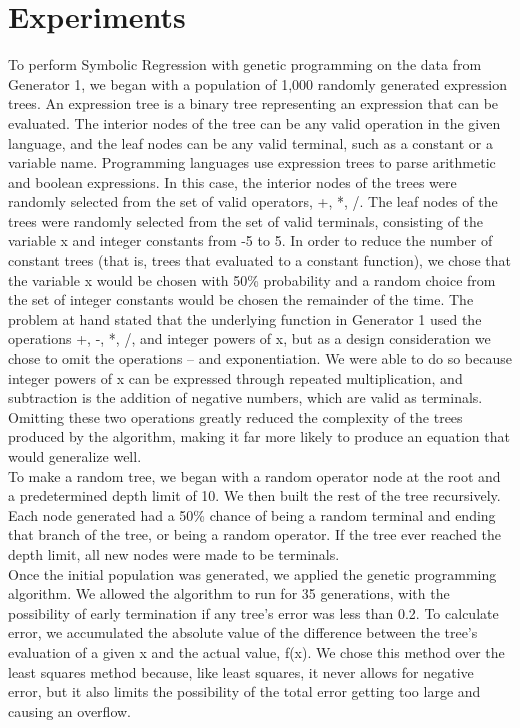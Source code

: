 
\section{Experiments}
\label{sec:expts}

	To perform Symbolic Regression with genetic programming on the
        data from Generator 1, we began with a population of 1,000
        randomly generated expression trees. An expression tree is a binary tree representing an expression that can be evaluated. The interior nodes of the tree can be any valid operation in the given language, and the leaf nodes can be any valid terminal, such as a constant or a variable name. Programming languages use expression trees to parse arithmetic and boolean expressions. In this case, the interior nodes of the
        trees were randomly selected from the set of valid operators,
        {+, *, /}. The leaf nodes of the trees were randomly selected
        from the set of valid terminals, consisting of the variable x
        and integer constants from -5 to 5. In order to reduce the
        number of constant trees (that is, trees that evaluated to a
        constant function), we chose that the variable x would be
        chosen with 50\% probability and a random choice from the set
        of integer constants would be chosen the remainder of the
        time. The problem at hand stated that the underlying function
        in Generator 1 used the operations +, -, *, /, and integer
        powers of x, but as a design consideration we chose to omit
        the operations – and exponentiation. We were able to do so
        because integer powers of x can be expressed through repeated
        multiplication, and subtraction is the addition of negative
        numbers, which are valid as terminals. Omitting these two
        operations greatly reduced the complexity of the trees
        produced by the algorithm, making it far more likely to
        produce an equation that would generalize well.\\

	To make a random tree, we began with a random operator node at
        the root and a predetermined depth limit of 10. We then built
        the rest of the tree recursively. Each node generated had a
        50\% chance of being a random terminal and ending that branch
        of the tree, or being a random operator. If the tree ever
        reached the depth limit, all new nodes were made to be
        terminals.\\

	Once the initial population was generated, we applied the
        genetic programming algorithm. We allowed the algorithm to run
        for 35 generations, with the possibility of early termination
        if any tree’s error was less than 0.2. To calculate error, we
        accumulated the absolute value of the difference between the
        tree’s evaluation of a given x and the actual value, f(x). We
        chose this method over the least squares method because, like
        least squares, it never allows for negative error, but it also
        limits the possibility of the total error getting too large
        and causing an overflow.\\

